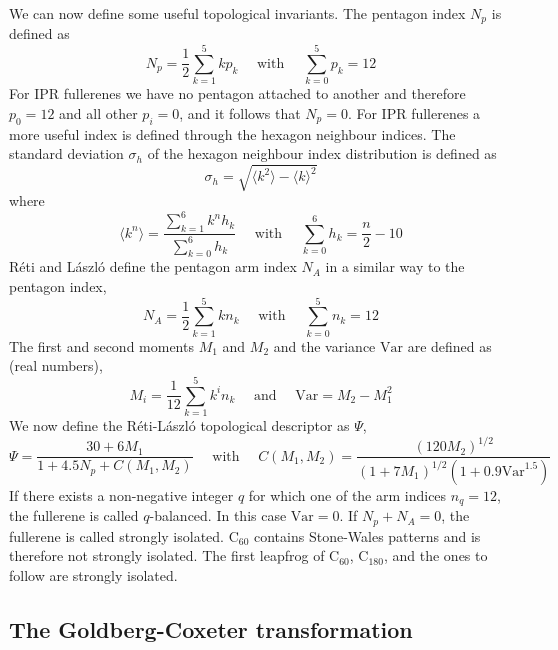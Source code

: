 \documentclass[article,a4paper,twoside]{memoir}
\newcommand{\C}[1]{\ensuremath{\mathrm{C}_{#1}}}
\begin{document}
We can now define some useful topological invariants. The pentagon index $N_p$ is defined as
\begin{equation}
  \label{pentindex}
  N_p = \frac{1}{2}\sum_{k=1}^{5} kp_k \quad \text{ with } \quad  \sum_{k=0}^{5} p_k = 12
\end{equation}
For IPR fullerenes we have no pentagon attached to another and therefore $p_0 = 12$
and all other $p_i = 0$, and it follows that $N_p = 0$.  For IPR fullerenes a more
useful index is defined through the hexagon neighbour indices.  The standard deviation
$\sigma_h$ of the hexagon neighbour index distribution is defined as
\begin{equation}
  \label{standev}
  \sigma_h = \sqrt{\langle k^2 \rangle - \langle k \rangle^2}
\end{equation}
where
\begin{equation}
  \label{mean}
  \langle k^n \rangle = \frac{\sum_{k=1}^{6} k^n h_k}{\sum_{k=0}^{6} h_k}  \quad \text{ with } \quad  \sum_{k=0}^{6} h_k = \frac{n}{2} - 10
\end{equation}
R\'eti and L\'aszl\'o define the pentagon arm index $N_A$ in a similar way to the pentagon index,\cite{Reti}
\begin{equation}
  \label{arms}
  N_A = \frac{1}{2}\sum_{k=1}^{5} kn_k  \quad \text{ with } \quad  \sum_{k=0}^{5} n_k = 12
\end{equation}
The first and second moments $M_1$ and $M_2$ and the variance $\text{Var}$ are defined as (real numbers),
\begin{equation}
  \label{Moments}
  M_i = \frac{1}{12}\sum_{k=1}^{5} k^i n_k  \quad \text{ and } \quad  \text{Var}= M_2 - M_1^2
\end{equation}
We now define the R\'eti-L\'aszl\'o topological descriptor as $\Psi$,
\begin{equation}
  \label{Moments}
  \Psi = \frac{30+6M_1}{1+4.5N_p+C(M_1,M_2)} \quad \text{ with } \quad  C(M_1,M_2) = \frac{(120M_2)^{1/2}}{(1+7M_1)^{1/2}(1+0.9\text{Var}^{1.5})}
\end{equation}
If there exists a non-negative integer $q$ for which one of the arm indices $n_q = 12$,
the fullerene is called $q$-balanced.  In this case $\text{Var} = 0$.\cite{Reti}
If $N_p + N_A = 0$, the fullerene is called strongly isolated.  \C{60} contains Stone-Wales
patterns and is therefore not strongly isolated. The first leapfrog of \C{60}, \C{180},
and the ones to follow are strongly isolated.


\subsection{The Goldberg-Coxeter transformation}
\end{document}
